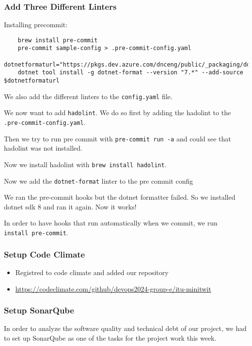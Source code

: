 \subsubsection{Add Three Different Linters}
\label{log:add-three-different-linters}

Installing precommit:
\begin{verbatim}
    brew install pre-commit
    pre-commit sample-config > .pre-commit-config.yaml
    dotnetformaturl="https://pkgs.dev.azure.com/dnceng/public/_packaging/dotnet7/nuget/v3/index.json"
    dotnet tool install -g dotnet-format --version "7.*" --add-source $dotnetformaturl
\end{verbatim}

We also add the different linters to the \texttt{config.yaml} file.

We now want to add \texttt{hadolint}. We do so first by adding the
hadolint to the \texttt{.pre-commit-config.yaml}.

Then we try to run pre commit with \texttt{pre-commit\ run\ -a} and
could see that hadolint was not installed.

Now we install hadolint with \texttt{brew\ install\ hadolint}.

Now we add the \texttt{dotnet-format} linter to the pre commit config

We ran the pre-commit hooks but the dotnet formatter failed. So we
installed dotnet sdk 8 and ran it again. Now it works!

In order to have hooks that run automatically when we commit, we run
\texttt{install\ pre-commit}.

\subsubsection{Setup Code Climate}
\label{log:setup-code-climate}

\begin{itemize}
    \item Registred to code climate and added our repository
    \item \url{https://codeclimate.com/github/devops2024-group-e/itu-minitwit}
\end{itemize}

\subsubsection{Setup SonarQube}
\label{log:setup-sonarqube}

In order to analyze the software quality and technical debt of our project, we had to set up SonarQube as one of the tasks for the project work this week.

